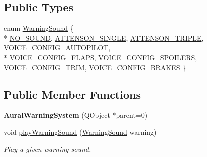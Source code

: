 \subsection*{Public Types}
\begin{DoxyCompactItemize}
\item 
enum \hyperlink{class_challenger604_systems_1_1_aural_warning_system_a06a8a8fa973dde5ad449b8e0ca058a26}{Warning\-Sound} \{ \\*
\hyperlink{class_challenger604_systems_1_1_aural_warning_system_a06a8a8fa973dde5ad449b8e0ca058a26ae5acb874e76f6c7d2d6797a6bd4f6c92}{N\-O\-\_\-\-S\-O\-U\-N\-D}, 
\hyperlink{class_challenger604_systems_1_1_aural_warning_system_a06a8a8fa973dde5ad449b8e0ca058a26a025c85b32f7dbf0d8315ef8f2e77bbd4}{A\-T\-T\-E\-N\-S\-O\-N\-\_\-\-S\-I\-N\-G\-L\-E}, 
\hyperlink{class_challenger604_systems_1_1_aural_warning_system_a06a8a8fa973dde5ad449b8e0ca058a26a3e646145879a1348aaf200172ee7447b}{A\-T\-T\-E\-N\-S\-O\-N\-\_\-\-T\-R\-I\-P\-L\-E}, 
\hyperlink{class_challenger604_systems_1_1_aural_warning_system_a06a8a8fa973dde5ad449b8e0ca058a26a30c6c977caa3fbab45146589acb232ec}{V\-O\-I\-C\-E\-\_\-\-C\-O\-N\-F\-I\-G\-\_\-\-A\-U\-T\-O\-P\-I\-L\-O\-T}, 
\\*
\hyperlink{class_challenger604_systems_1_1_aural_warning_system_a06a8a8fa973dde5ad449b8e0ca058a26af20954d866a46ed5539c2d6d81a9c9a7}{V\-O\-I\-C\-E\-\_\-\-C\-O\-N\-F\-I\-G\-\_\-\-F\-L\-A\-P\-S}, 
\hyperlink{class_challenger604_systems_1_1_aural_warning_system_a06a8a8fa973dde5ad449b8e0ca058a26a707d255555ec77620480215ec14b2a7e}{V\-O\-I\-C\-E\-\_\-\-C\-O\-N\-F\-I\-G\-\_\-\-S\-P\-O\-I\-L\-E\-R\-S}, 
\hyperlink{class_challenger604_systems_1_1_aural_warning_system_a06a8a8fa973dde5ad449b8e0ca058a26af2e437e7f4c7a1fd9985350ff311b5ec}{V\-O\-I\-C\-E\-\_\-\-C\-O\-N\-F\-I\-G\-\_\-\-T\-R\-I\-M}, 
\hyperlink{class_challenger604_systems_1_1_aural_warning_system_a06a8a8fa973dde5ad449b8e0ca058a26a379c2e15ededaadbe21fbc47c197fd4a}{V\-O\-I\-C\-E\-\_\-\-C\-O\-N\-F\-I\-G\-\_\-\-B\-R\-A\-K\-E\-S}
 \}
\end{DoxyCompactItemize}
\subsection*{Public Member Functions}
\begin{DoxyCompactItemize}
\item 
\hypertarget{class_challenger604_systems_1_1_aural_warning_system_afba7508606402b203b6486936afc8ed5}{{\bfseries Aural\-Warning\-System} (Q\-Object $\ast$parent=0)}\label{class_challenger604_systems_1_1_aural_warning_system_afba7508606402b203b6486936afc8ed5}

\item 
void \hyperlink{class_challenger604_systems_1_1_aural_warning_system_a0d28225a9215fff9d86834388068c5dc}{play\-Warning\-Sound} (\hyperlink{class_challenger604_systems_1_1_aural_warning_system_a06a8a8fa973dde5ad449b8e0ca058a26}{Warning\-Sound} warning)
\begin{DoxyCompactList}\small\item\em Play a given warning sound. \end{DoxyCompactList}\end{DoxyCompactItemize}


